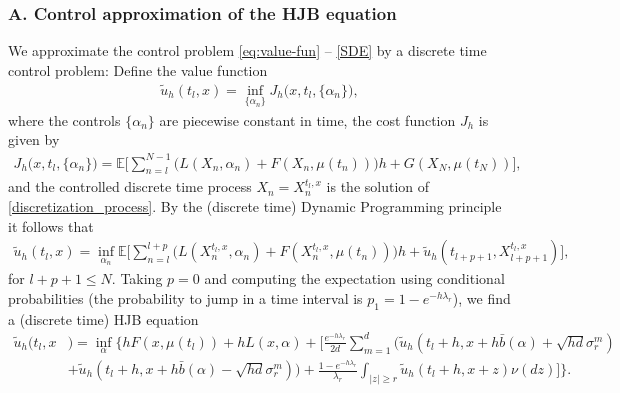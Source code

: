\documentclass[a4paper,  twoside, 10pt, leqno]{amsart}
\theoremstyle{remark}
\theoremstyle{definition}
\begin{document}
\subsubsection*{A. Control approximation of the HJB equation}
We approximate the control problem \eqref{eq:value-fun} -- \eqref{SDE}
by a discrete time control problem: Define the value function
\begin{align}\label{eq:approx-value-fun}
    \tilde u_h (t_l , x ) = \inf_{ \{\alpha_n \} } J_h \big( x,t_l , \{\alpha_n \} \big),
\end{align}
where the  controls $\{\alpha_n\}$ are piecewise constant in time, the cost
function $J_h$ is given by
\begin{align}
    J_h \big( x,t_l , \{\alpha_n \} \big) = \mathbb{E} \bigg[ \sum_{n=l}^{N-1} \Big( L ( X_{n}, \alpha_n ) + F ( X_n, \mu(t_n) ) \Big) h %
    + G (X_N,\mu(t_N)) \bigg],
    \label{discretized_value_fun}
\end{align}
and the controlled discrete time process $X_n=X_n^{t_l,x}$  is the solution of
\eqref{discretization_process}. 
By the (discrete time) Dynamic Programming principle it follows that
 \begin{align*}
    \tilde u_h (t_l ,x ) = \inf_{\alpha_n}\mathbb{E} \bigg[ \sum_{n=l}^{l+p} \Big( L ( X_{n}^{t_l ,x}, \alpha_n ) + F ( X_n^{t_l ,x}, \mu(t_n) ) \Big) h %
    + \tilde u_h (t_{l+p+1}, X_{l+p+1}^{t_l,x} ) \bigg],
 \end{align*} 
for $l+p+1\leq N$. Taking $p=0$ and computing the expectation
using conditional probabilities (the probability to jump in a time
interval is $p_1=1-e^{-h\lambda_r}$), we
find a (discrete time) HJB equation 
\begin{align}
    \tilde u_h (t_l ,x&) =  \inf_{\alpha} \bigg\{ h F ( x, \mu(t_l ) ) + h L (x,\alpha) + \Big[\frac{e^{-h \lambda_r}}{2d} \sum_{m=1}^d \big(\tilde u_h (t_l +h, x + h \bar{b} (\alpha) + \sqrt{hd} \sigma_r^m )  \nonumber\\ 
        & + \tilde u_h(t_l +h, x+ h\bar{b} (\alpha) - \sqrt{hd} \sigma_r^m )
      \big) + \frac{1-e^{-h\lambda_r}}{\lambda_r} \int_{|z| \geq r}
      \tilde u_h (t_l +h,x+z) \nu (dz) \Big] \bigg\}.\label{approx-HJB}
\end{align}
  
\end{document}
